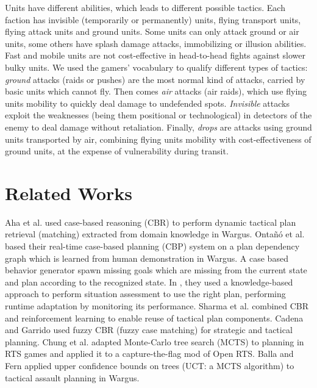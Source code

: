 Units have different abilities, which leads to different possible tactics. Each faction has invisible (temporarily or permanently) units, flying transport units, flying attack units and ground units. Some units can only attack ground or air units, some others have splash damage attacks, immobilizing or illusion abilities. Fast and mobile units are not cost-effective in head-to-head fights against slower bulky units. We used the gamers' vocabulary to qualify different types of tactics: \textit{ground} attacks (raids or pushes) are the most normal kind of attacks, carried by basic units which cannot fly. Then comes \textit{air} attacks (air raids), which use flying units mobility to quickly deal damage to undefended spots. \textit{Invisible} attacks exploit the weaknesses (being them positional or technological) in detectors of the enemy to deal damage without retaliation. Finally, \textit{drops} are attacks using ground units transported by air, combining flying units mobility with cost-effectiveness of ground units, at the expense of vulnerability during transit.


\section{Related Works}
Aha et al. \cite{LTW} used case-based reasoning (CBR) to perform dynamic tactical plan retrieval (matching) extracted from domain knowledge in Wargus. Onta\~{n}\'{o} et al. \cite{Ontanon07} based their real-time case-based planning (CBP) system on a plan dependency graph which is learned from human demonstration in Wargus. A case based behavior generator spawn missing goals which are missing from the current state and plan according to the recognized state. In \cite{PlanRetrieval,meta-rts}, they used a knowledge-based approach to perform situation assessment to use the right plan, performing runtime adaptation by monitoring its performance. Sharma et al. \cite{CBR-RL} combined CBR and reinforcement learning to enable reuse of tactical plan components. Cadena and Garrido \cite{CadenaG11} used fuzzy CBR (fuzzy case matching) for strategic and tactical planning. Chung et al. \cite{Chung05} adapted Monte-Carlo tree search (MCTS) to planning in RTS games and applied it to a capture-the-flag mod of Open RTS. Balla and Fern \cite{Balla_uctfor} applied upper confidence bounds on trees (UCT: a MCTS algorithm) to tactical assault planning in Wargus. 

